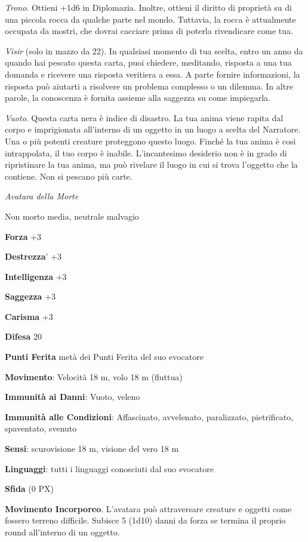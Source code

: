 \begin{multicols}{2}
	\textit{Trono}. Ottieni +1d6 in Diplomazia. Inoltre, ottieni il diritto di proprietà su di una piccola rocca da qualche parte nel mondo. Tuttavia, la rocca è attualmente occupata da mostri, che dovrai cacciare prima di poterla rivendicare come tua.

	\textit{Visir} (solo in mazzo da 22). In qualsiasi momento di tua scelta, entro un anno da quando hai pescato questa carta, puoi chiedere, meditando, risposta a una tua domanda e ricevere una risposta veritiera a essa. A parte fornire informazioni, la risposta può aiutarti a risolvere un problema complesso o un dilemma. In altre parole, la conoscenza è fornita assieme alla saggezza su come impiegarla.

	\textit{Vuoto}. Questa carta nera è indice di disastro. La tua anima viene rapita dal corpo e imprigionata all'interno di un oggetto in un luogo a scelta del Narratore. Una o più potenti creature proteggono questo luogo. Finché la tua anima è così intrappolata, il tuo corpo è inabile. L'incantesimo desiderio non è in grado di ripristinare la tua anima, ma può rivelare il luogo in cui si trova l'oggetto che la contiene. Non si pescano più carte.

	\textit{Avatara della Morte}

	Non morto media, neutrale malvagio

	\textbf{Forza} +3

	\textbf{Destrezza}' +3

	\textbf{Intelligenza} +3

	\textbf{Saggezza} +3

	\textbf{Carisma} +3

	\textbf{Difesa} 20

	\textbf{Punti Ferita} metà dei Punti Ferita del suo evocatore

	\textbf{Movimento}: Velocità 18 m, volo 18 m (fluttua)

	\textbf{Immunità ai Danni}: Vuoto, veleno

	\textbf{Immunità alle Condizioni}: Affascinato, avvelenato, paralizzato, pietrificato, spaventato, svenuto

	\textbf{Sensi}: scurovisione 18 m, visione del vero 18 m

	\textbf{Linguaggi}: tutti i linguaggi conosciuti dal suo evocatore

	\textbf{Sfida} (0 PX)

	\textbf{Movimento Incorporeo}. L'avatara può attraversare creature e oggetti come fossero terreno difficile. Subisce 5 (1d10) danni da forza se termina il proprio round all'interno di un oggetto.


\end{multicols}
